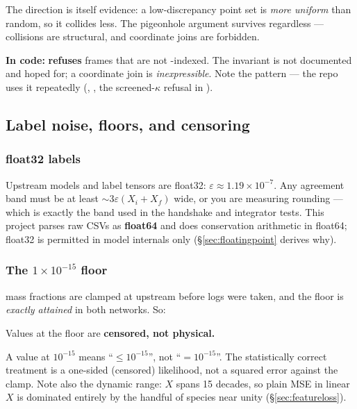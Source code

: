 The direction is itself evidence: a low-discrepancy point set is \emph{more
uniform} than random, so it collides less. The pigeonhole argument survives
regardless --- collisions are structural, and coordinate joins are forbidden.

\begin{repopointer}
\textbf{In code:}  \textbf{refuses}
frames that are not -indexed. The invariant is not documented and
hoped for; a coordinate join is \emph{inexpressible}. Note the pattern --- the
repo uses it repeatedly (, , the
screened-$\kappa$ refusal in ).
\end{repopointer}

\subsection{Label noise, floors, and censoring}
\label{sec:labelnoise}

\subsubsection{float32 labels}
\label{sec:float32labels}

Upstream models and label tensors are float32:
$\varepsilon \approx 1.19\times10^{-7}$. Any agreement band must be at least
${\sim}3\varepsilon(X_i + X_f)$ wide, or you are measuring rounding --- which is
exactly the band used in the handshake and integrator tests. This project parses
raw CSVs as \textbf{float64} and does conservation arithmetic in float64;
float32 is permitted in model internals only (\S\ref{sec:floatingpoint} derives
why).

\subsubsection{The \texorpdfstring{$1\times10^{-15}$}{1e-15} floor}
\label{sec:floor}

 mass fractions are clamped at 
upstream before logs were taken, and the floor is \emph{exactly attained} in
both networks. So:

\begin{result}
Values at the floor are \textbf{censored, not physical.}
\end{result}

A value at $10^{-15}$ means ``$\leq 10^{-15}$'', not ``$= 10^{-15}$''. The
statistically correct treatment is a one-sided (censored) likelihood, not a
squared error against the clamp. Note also the dynamic range: $X$ spans 15
decades, so plain MSE in linear $X$ is dominated entirely by the handful of
species near unity (\S\ref{sec:featureloss}).

